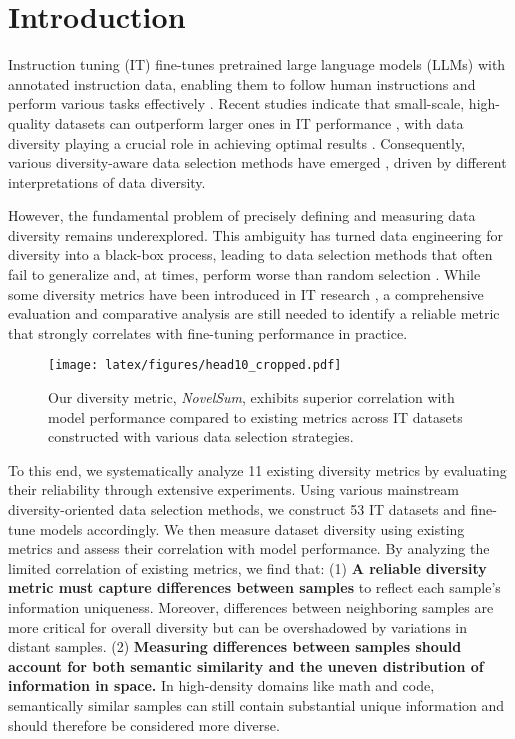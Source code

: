 \section{Introduction}
Instruction tuning (IT) fine-tunes pretrained large language models (LLMs) with annotated instruction data, enabling them to follow human instructions and perform various tasks effectively \cite{sanh2022multitask, zhang2023instruction}. Recent studies indicate that small-scale, high-quality datasets can outperform larger ones in IT performance \cite{chen2023maybe-Kcentergreedy, zhou2024lima}, with data diversity playing a crucial role in achieving optimal results \cite{liu2023makes, bukharin2023data-QDIT, zhang2024instruction, yang2024beyond}. Consequently, various diversity-aware data selection methods have emerged \cite{qin2024unleashing, wang2024survey}, driven by different interpretations of data diversity.

However, the fundamental problem of precisely defining and measuring data diversity remains underexplored. This ambiguity has turned data engineering for diversity into a black-box process, leading to data selection methods that often fail to generalize and, at times, perform worse than random selection \cite{xia2024rethinking,diddee2024chasing}. 
While some diversity metrics have been introduced in IT research \cite{bukharin2023data-QDIT,wang2024diversity-logD}, a comprehensive evaluation and comparative analysis are still needed to identify a reliable metric that strongly correlates with fine-tuning performance in practice. 

\begin{figure}[t!]
    \centering
        \texttt{[image: latex/figures/head10\_cropped.pdf]}
    \caption{Our diversity metric, \textit{NovelSum}, exhibits superior correlation with model performance compared to existing metrics across IT datasets constructed with various data selection strategies.}
    \label{fig:head}
    \vspace{-4mm}
\end{figure}


To this end, we systematically analyze 11 existing diversity metrics by evaluating their reliability through extensive experiments. Using various mainstream diversity-oriented data selection methods, we construct 53 IT datasets and fine-tune models accordingly. We then measure dataset diversity using existing metrics and assess their correlation with model performance. By analyzing the limited correlation of existing metrics, we find that: (1) \textbf{A reliable diversity metric must capture differences between samples} to reflect each sample's information uniqueness. Moreover, differences between neighboring samples are more critical for overall diversity but can be overshadowed by variations in distant samples. (2) \textbf{Measuring differences between samples should account for both semantic similarity and the uneven distribution of information in space.} In high-density domains like math and code, semantically similar samples can still contain substantial unique information and should therefore be considered more diverse.


